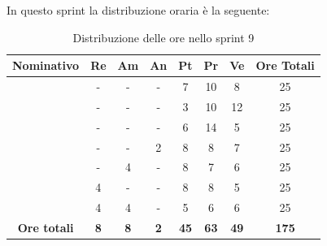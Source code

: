In questo sprint la distribuzione oraria è la seguente:
\begin{table}[H]
		\begin{center}
			\setlength{\aboverulesep}{0pt}
			\setlength{\belowrulesep}{0pt}
			\setlength{\extrarowheight}{.75ex}
			\begin{tabular}{ c c c c c c c c }
				\rowcolor{AzzurroGruppo!30} 
				\textbf{Nominativo} & \textbf{Re} & \textbf{Am} & \textbf{An} & \textbf{Pt} & \textbf{Pr} & \textbf{Ve} & \textbf{Ore Totali}  \\
				\toprule
				\Davide    & - & - & - & 7 & 10 & 8 & 25 \\
				\Giosue    & - & - & - & 3 & 10 & 12 & 25 \\
				\Francesco & - & - & - & 6 & 14 & 5 & 25 \\
				\Daniele   & - & - & 2 & 8 & 8 & 7 & 25 \\
				\Lucrezia  & - & 4 & - & 8 & 7 & 6 & 25 \\
				\Matteo    & 4 & - & - & 8 & 8 & 5 & 25 \\
				\Tommaso   & 4 & 4 & - & 5 & 6 & 6 & 25 \\
				 \textbf{Ore totali} & \textbf{8} & \textbf{8} & \textbf{2} & \textbf{45} & \textbf{63} & \textbf{49} & \textbf{175} \\
				\bottomrule
			\end{tabular}
			\caption{Distribuzione delle ore nello sprint 9}
		\end{center}
	\end{table}


